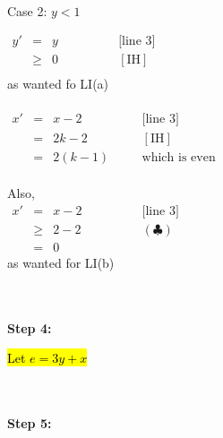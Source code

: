 \documentclass[12pt]{article}
\begin{document}
\begin{minipage}{\dimexpr\textwidth-10mm}
\begin{minipage}{\dimexpr\textwidth-10mm}
\begin{minipage}{\dimexpr\textwidth-10mm}
		\end{minipage}\\
		Case 2: $y < 1$

		\hfill\begin{minipage}{\dimexpr\textwidth-10mm}
			$\begin{array}{lcll}
					y' & =    & y \qquad \qquad & \text{[line 3]} \\
					   & \geq & 0               & [\text{IH}]     \\
				\end{array}$\\
			as wanted fo LI(a)
			\\\\
			$\begin{array}{lcll}
					x' & = & x-2 \qquad \qquad & \text{[line 3]}      \\
					   & = & 2k - 2            & [\text{IH}]          \\
					   & = & 2(k-1)            & \text{which is even}
				\end{array}$
			\\\\
			Also,\\
			$\begin{array}{lcll}
					x' & =    & x-2 \qquad \qquad & \text{[line 3]} \\
					   & \geq & 2 - 2             & (\clubsuit)     \\
					   & =    & 0                 &
				\end{array}$\\
			as wanted for LI(b)\\

		\end{minipage}
	\end{minipage}
\end{minipage}
\\\\\newpage
\noindent \textbf{Step 4:} %

\hfill\begin{minipage}{\dimexpr\textwidth-10mm}
	\hl{Let $e = 3y + x$}
\end{minipage}
\\\\
\textbf{Step 5:} %
\end{document}
